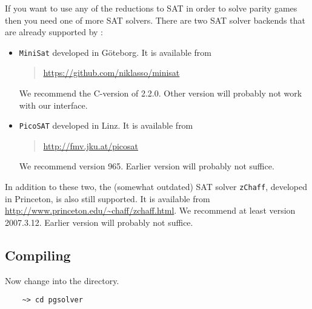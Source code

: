 If you want to use any of the reductions to SAT in order to solve parity games then you need one of more SAT solvers. 
There are two SAT solver backends that are already supported by \pgsolver:
\begin{itemize}
        \item \texttt{MiniSat} developed in G\"oteborg. It is available from
        \begin{quotation}
      \url{https://github.com/niklasso/minisat}
        \end{quotation}
        We recommend the C-version of 2.2.0. Other version will probably not
        work with our interface.

        \item \texttt{PicoSAT} developed in Linz. It is available from
        \begin{quotation}
      \url{http://fmv.jku.at/picosat}
        \end{quotation}
        We recommend version 965. Earlier version will probably not suffice.
\end{itemize}
In addition to these two, the (somewhat outdated) SAT solver \texttt{zChaff}, developed in Princeton, is also still supported. 
It is available from \url{http://www.princeton.edu/~chaff/zchaff.html}. We recommend at least version 2007.3.12. Earlier version 
will probably not suffice.


\subsection{Compiling \pgsolver}

Now change into the \pgsolver directory.
\begin{verbatim}
    ~> cd pgsolver
\end{verbatim}


